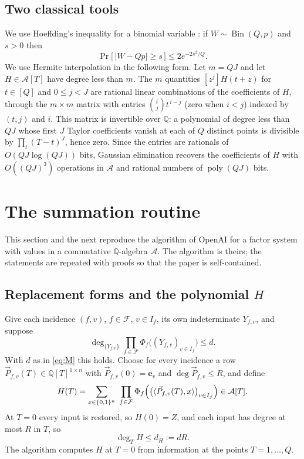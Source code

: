 \documentclass[11pt,reqno]{amsart}
\numberwithin{equation}{section}
\theoremstyle{plain}
\theoremstyle{definition}
\theoremstyle{remark}
\DeclareMathOperator{\Bin}{Bin}
\DeclareMathOperator{\poly}{poly}
\newcommand{\A}{\mathcal{A}}
\newcommand{\F}{\mathcal{F}}
\newcommand{\Q}{\mathbb{Q}}
\newcommand{\e}{\mathbf{e}}
\newcommand{\PP}{\vec{P}}
\newcommand{\ip}[2]{\langle #1,#2\rangle}
\newcommand{\oai}{OpenAI}
\begin{document}
\subsection{Two classical tools}
We use Hoeffding's inequality for a binomial variable \cite{Hoe63}: if
$W\sim\Bin(Q,p)$ and $s>0$ then
\begin{equation}\label{eq:hoeffding}
  \Pr\bigl[\,|W-Qp|\ge s\,\bigr]\le 2e^{-2s^2/Q}.
\end{equation}
We use Hermite interpolation in the following form. Let $m=QJ$ and let
$H\in\A[T]$ have degree less than $m$. The $m$ quantities
$[z^j]H(t+z)$ for $t\in[Q]$ and $0\le j<J$ are rational linear combinations of
the coefficients of $H$, through the $m\times m$ matrix with entries
$\binom{i}{j}t^{\,i-j}$ (zero when $i<j$) indexed by $(t,j)$ and $i$. This matrix
is invertible over $\Q$: a polynomial of degree less than $QJ$ whose first $J$
Taylor coefficients vanish at each of $Q$ distinct points is divisible by
$\prod_t(T-t)^J$, hence zero. Since the entries are rationals of
$O(QJ\log(QJ))$ bits, Gaussian elimination recovers the coefficients of $H$ with
$O((QJ)^3)$ operations in $\A$ and rational numbers of $\poly(QJ)$ bits.

\section{The summation routine}\label{sec:routine}

This section and the next reproduce the algorithm of \oai{}
\cite[Sections 3--4]{OAI26} for a factor system with values in a commutative
$\Q$-algebra $\A$. The algorithm is theirs; the statements are repeated with
proofs so that the paper is self-contained.

\subsection{Replacement forms and the polynomial $H$}
Give each incidence $(f,v)$, $f\in\F$, $v\in I_f$, its own indeterminate
$Y_{f,v}$, and suppose
\begin{equation}\label{eq:degbound}
  \deg_{\{Y_{f,v}\}}\prod_{f\in\F}\Phi_f\bigl((Y_{f,v})_{v\in I_f}\bigr)\le d .
\end{equation}
With $d$ as in \eqref{eq:M} this holds. Choose for every incidence a row
$\PP_{f,v}(T)\in\Q[T]^{1\times n}$ with $\PP_{f,v}(0)=\e_v$ and $\deg\PP_{f,v}\le R$,
and define
\begin{equation}\label{eq:H}
  H(T)=\sum_{x\in\{0,1\}^n}\ \prod_{f\in\F}\Phi_f\Bigl(\bigl(\ip{\PP_{f,v}(T)}{x}\bigr)_{v\in I_f}\Bigr)\in\A[T].
\end{equation}
At $T=0$ every input is restored, so $H(0)=Z$, and each input has degree at most
$R$ in $T$, so
\begin{equation}\label{eq:dH}
  \deg_T H\le d_H:=dR .
\end{equation}
The algorithm computes $H$ at $T=0$ from information at the points $T=1,\dots,Q$.
\end{document}

